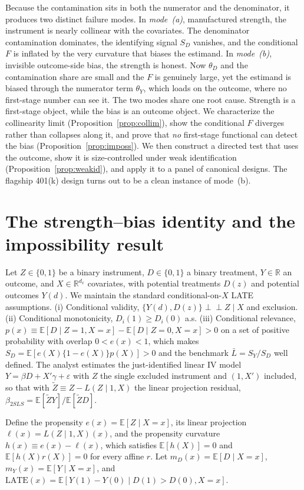 \documentclass[11pt]{article}
\theoremstyle{plain}
\theoremstyle{definition}
\newcommand{\E}{\mathbb{E}}
\newcommand{\Lb}{\bar{L}}
\newcommand{\Zt}{\tilde{Z}}
\newcommand{\indep}{\perp\!\!\!\perp}
\begin{document}
Because the contamination sits in both the numerator and the denominator, it produces two distinct failure modes. In \emph{mode~(a)}, manufactured strength, the instrument is nearly collinear with the covariates. The denominator contamination dominates, the identifying signal $S_D$ vanishes, and the conditional $F$ is inflated by the very curvature that biases the estimand. In \emph{mode~(b)}, invisible outcome-side bias, the strength is honest. Now $\theta_D$ and the contamination share are small and the $F$ is genuinely large, yet the estimand is biased through the numerator term $\theta_Y$, which loads on the outcome, where no first-stage number can see it. The two modes share one root cause. Strength is a first-stage object, while the bias is an outcome object. We characterize the collinearity limit (Proposition~\ref{prop:collim}), show the conditional $F$ diverges rather than collapses along it, and prove that \emph{no} first-stage functional can detect the bias (Proposition~\ref{prop:imposs}). We then construct a directed test that uses the outcome, show it is size-controlled under weak identification (Proposition~\ref{prop:weakid}), and apply it to a panel of canonical designs. The flagship 401(k) design turns out to be a clean instance of mode~(b).

\section{The strength--bias identity and the impossibility result}\label{sec:framework}

Let $Z\in\{0,1\}$ be a binary instrument, $D\in\{0,1\}$ a binary treatment, $Y\in\mathbb{R}$ an outcome, and $X\in\mathbb{R}^{d_x}$ covariates, with potential treatments $D(z)$ and potential outcomes $Y(d)$. We maintain the standard conditional-on-$X$ LATE assumptions. (i) Conditional validity, $\{Y(d),D(z)\}\indep Z\mid X$ and exclusion. (ii) Conditional monotonicity, $D_i(1)\ge D_i(0)$ a.s. (iii) Conditional relevance, $p(x)\equiv\E[D\mid Z=1,X=x]-\E[D\mid Z=0,X=x]>0$ on a set of positive probability with overlap $0<e(x)<1$, which makes $S_D=\E[e(X)\{1-e(X)\}p(X)]>0$ and the benchmark $\Lb=S_Y/S_D$ well defined. The analyst estimates the just-identified linear IV model $Y=\beta D+X'\gamma+\varepsilon$ with $Z$ the single excluded instrument and $(1,X')$ included, so that with $\Zt\equiv Z-L(Z\mid 1,X)$ the linear projection residual, $\beta_{2SLS}=\E[\Zt Y]/\E[\Zt D]$.

Define the propensity $e(x)=\E[Z\mid X=x]$, its linear projection $\ell(x)=L(Z\mid 1,X)(x)$, and the propensity curvature $h(x)\equiv e(x)-\ell(x)$, which satisfies $\E[h(X)]=0$ and $\E[h(X)r(X)]=0$ for every affine $r$. Let $m_D(x)=\E[D\mid X=x]$, $m_Y(x)=\E[Y\mid X=x]$, and $\mathrm{LATE}(x)=\E[Y(1)-Y(0)\mid D(1)>D(0),X=x]$.
\end{document}
